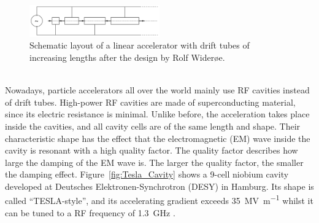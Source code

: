 \begin{figure}
\centering
\includegraphics[width=0.5\textwidth]{Figures/Wideroe_Linac.png}
\caption[Schematic layout of a Wider\o e linac]{Schematic layout of a linear accelerator with drift tubes of increasing lengths after the design by Rolf Wider\o e.~\cite[p. 40]{Hinterberger}}
\label{fig:Wideroe_Linac}
\end{figure}
\\
Nowadays, particle accelerators all over the world mainly use RF cavities instead of drift tubes.
High-power RF cavities are made of superconducting material, since its electric resistance is minimal.
Unlike before, the acceleration takes place inside the cavities, and all cavity cells are of the same length and shape.
Their characteristic shape has the effect that the electromagnetic (EM) wave inside the cavity is resonant with a high quality factor.
The quality factor describes how large the damping of the EM wave is.
The larger the quality factor, the smaller the damping effect.
Figure~\ref{fig:Tesla_Cavity} shows a 9-cell niobium cavity developed at Deutsches Elektronen-Synchrotron (DESY) in Hamburg.
Its shape is called ``TESLA-style'', and its accelerating gradient exceeds \SI{35}{\mega\volt\per\meter} whilst it can be tuned to a RF frequency of \SI{1.3}{\giga\hertz} .~\cite[p. 15f]{TDR31}
